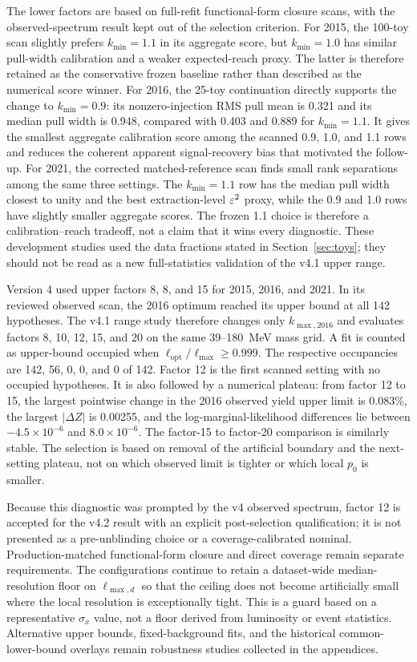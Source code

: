 The lower factors are based on full-refit functional-form closure scans, with the
observed-spectrum result kept out of the selection criterion. For 2015, the 100-toy
scan slightly prefers $k_{\min}=1.1$ in its aggregate score, but $k_{\min}=1.0$ has
similar pull-width calibration and a weaker expected-reach proxy. The latter is
therefore retained as the conservative frozen baseline rather than described as the
numerical score winner. For 2016, the 25-toy continuation directly supports the
change to $k_{\min}=0.9$: its nonzero-injection RMS pull mean is 0.321 and its median
pull width is 0.948, compared with 0.403 and 0.889 for $k_{\min}=1.1$. It gives the
smallest aggregate calibration score among the scanned 0.9, 1.0, and 1.1 rows and
reduces the coherent apparent signal-recovery bias that motivated the follow-up. For
2021, the corrected matched-reference scan finds small rank separations among the
same three settings. The $k_{\min}=1.1$ row has the median pull width closest to
unity and the best extraction-level $\varepsilon^2$ proxy, while the 0.9 and 1.0 rows have
slightly smaller aggregate scores. The frozen 1.1 choice is therefore a
calibration--reach tradeoff, not a claim that it wins every diagnostic. These
development studies used the data fractions stated in Section~\ref{sec:toys}; they
should not be read as a new full-statistics validation of the v4.1 upper range.

Version 4 used upper factors 8, 8, and 15 for 2015, 2016, and 2021. In its reviewed
observed scan, the 2016 optimum reached its upper bound at all 142 hypotheses. The
v4.1 range study therefore changes only $k_{\max,2016}$ and evaluates factors
8, 10, 12, 15, and 20 on the same 39--180~MeV mass grid. A fit is counted as
upper-bound occupied when $\ell_{\mathrm{opt}}/\ell_{\max}\geq0.999$. The respective
occupancies are 142, 56, 0, 0, and 0 of 142. Factor 12 is the first scanned setting
with no occupied hypotheses. It is also followed by a numerical plateau: from factor
12 to 15, the largest pointwise change in the 2016 observed yield upper limit is
0.083\%, the largest $|\Delta Z|$ is 0.00255, and the log-marginal-likelihood
differences lie between $-4.5\times10^{-6}$ and $8.0\times10^{-6}$. The factor-15 to
factor-20 comparison is similarly stable. The selection is based on removal of the
artificial boundary and the next-setting plateau, not on which observed limit is
tighter or which local $p_0$ is smaller.

Because this diagnostic was prompted by the v4 observed spectrum, factor 12 is
accepted for the v4.2 result with an explicit post-selection qualification; it is
not presented as a pre-unblinding choice or a coverage-calibrated nominal.
Production-matched functional-form closure and direct coverage remain separate
requirements.
The configurations continue to retain a dataset-wide median-resolution floor on
$\ell_{\max,d}$ so that the ceiling does not become artificially small where the
local resolution is exceptionally tight. This is a guard based on a representative
$\sigma_x$ value, not a floor derived from luminosity or event statistics.
Alternative upper bounds,
fixed-background fits, and the historical common-lower-bound overlays remain
robustness studies collected in the appendices.

